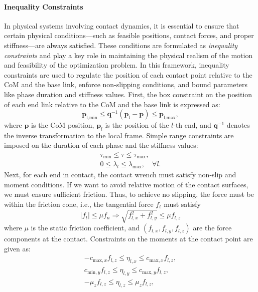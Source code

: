 \documentclass[main.tex]{subfiles}
\begin{document}
\paragraph{Inequality Constraints}
In physical systems involving contact dynamics, it is essential to ensure that certain physical conditions—such as feasible positions, contact forces, and proper stiffness—are always satisfied. These conditions are formulated as \textit{inequality constraints} and play a key role in maintaining the physical realism of the motion and feasibility of the optimization problem.
In this framework, inequality constraints are used to regulate the position of each contact point relative to the CoM and the base link, enforce non-slipping conditions, and bound parameters like phase duration and stiffness values.
First, the box constraint on the position of each end link relative to the CoM and the base link is expressed as:
\begin{equation}
\mathbf{p}_{\text{l,min}} \leq \mathbf{q}^{-1}(\mathbf{p}_l - \mathbf{p}) \leq \mathbf{p}_{\text{l,max}},
\end{equation}
where $\mathbf{p}$ is the CoM position, $\mathbf{p}_l$ is the position of the $l$-th end, and $\mathbf{q}^{-1}$ denotes the inverse transformation to the local frame.
Simple range constraints are imposed on the duration of each phase and the stiffness values:
\begin{align}
\tau_{\text{min}} \leq \tau \leq \tau_{\text{max}}, \\
0 \leq \lambda_l \leq \lambda_{\text{max}}, \quad \forall l.
\end{align}
Next, for each end in contact, the contact wrench must satisfy non-slip and moment conditions.  
If we want to avoid relative motion of the contact surfaces, we must ensure sufficient friction. Thus, to achieve no slipping, the force must be within the friction cone, i.e., the tangential force $f_t$ must satisfy 
\begin{equation}
    \lvert f_t \rvert \leq \mu f_n  \Longrightarrow \sqrt{f_{l,x}^2 + f_{l,y}^2} \leq \mu f_{l,z}
\end{equation}
where $\mu$ is the static friction coefficient, and $(f_{l,x}, f_{l,y}, f_{l,z})$ are the force components at the contact.
Constraints on the moments at the contact point are given as:
\begin{align}
-c_{\text{max},x} f_{l,z} \leq \eta_{l,x} \leq c_{\text{max},x} f_{l,z}, \\
c_{\text{min},y} f_{l,z} \leq \eta_{l,y} \leq c_{\text{max},y} f_{l,z}, \\
-\mu_z f_{l,z} \leq \eta_{l,z} \leq \mu_z f_{l,z},
\end{align}
\end{document}

